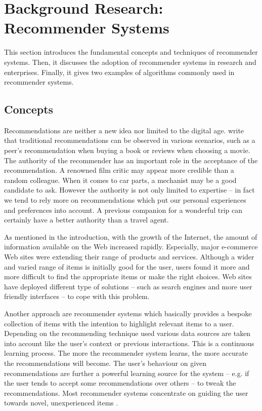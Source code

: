 \chapter{Background Research: Recommender Systems}

This section introduces the fundamental concepts and techniques of recommender systems. Then, it discusses the adoption of recommender systems in research and enterprises. Finally, it gives two examples of algorithms commonly used in recommender systems.

\section{Concepts}

Recommendations are neither a new idea nor limited to the digital age. \citet{ricci11} write that traditional recommendations can be observed in various scenarios, such as a peer's recommendation when buying a book or reviews when choosing a movie. The authority of the recommender has an important role in the acceptance of the recommendation. A renowned film critic may appear more credible than a random colleague. When it comes to car parts, a mechanist may be a good candidate to ask. However the authority is not only limited to expertise -- in fact we tend to rely more on recommendations which put our personal experiences and preferences into account. A previous companion for a wonderful trip can certainly have a better authority than a travel agent.

As mentioned in the introduction, with the growth of the Internet, the amount of information available on the Web increased rapidly. Especially, major e-commerce Web sites were extending their range of products and services. Although a wider and varied range of items is initially good for the user, users found it more and more difficult to find the appropriate items or make the right choices. Web sites have deployed different type of solutions -- such as search engines and more user friendly interfaces -- to cope with this problem.

Another approach are recommender systems which basically provides a bespoke collection of items with the intention to highlight relevant items to a user. Depending on the recommending technique used various data sources are taken into account like the user's context or previous interactions. This is a continuous learning process. The more the recommender system learns, the more accurate the recommendations will become. The user's behaviour on given recommendations are further a powerful learning source for the system -- e.g. if the user tends to accept some recommendations over others -- to tweak the recommendations. Most recommender systems concentrate on guiding the user towards novel, unexperienced items \cite{herlocker04}.



